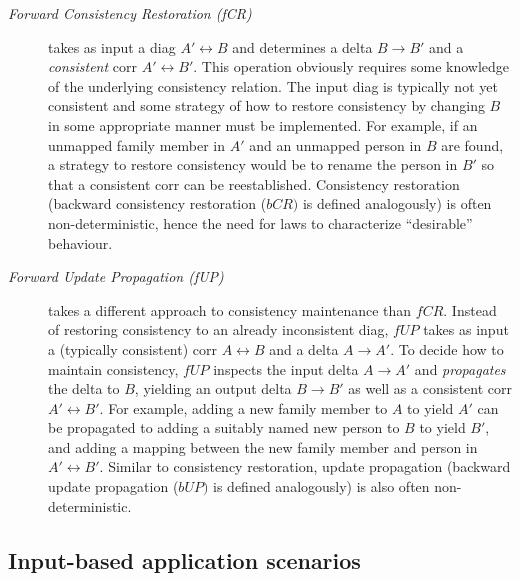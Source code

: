 \begin{description}
\item[\emph{Forward Consistency Restoration (fCR)}] takes as input a diag $A' \leftrightarrow B$ and determines a delta $B \rightarrow B'$ and a \emph{consistent} corr $A' \leftrightarrow B'$.
This operation obviously requires some knowledge of the underlying consistency relation.
The input diag is typically not yet consistent and some strategy of how to restore consistency by changing $B$ in some appropriate manner must be implemented.
For example, if an unmapped family member in $A'$ and an unmapped person in $B$ are found, a strategy to restore consistency would be to rename the person in $B'$ so that a consistent corr can be reestablished.
Consistency restoration (backward consistency restoration ($\mathit{bCR})$ is defined analogously) is often non-deterministic, hence the need for laws to characterize ``desirable'' behaviour.

\item[\emph{Forward Update Propagation (fUP)}] takes a different approach to consistency maintenance than $\mathit{fCR}$.
Instead of restoring consistency to an already inconsistent diag, $\mathit{fUP}$ takes as input a (typically consistent) corr $A \leftrightarrow B$ and a delta $A \rightarrow A'$.
To decide how to maintain consistency, $\mathit{fUP}$ inspects the input delta $A \rightarrow A'$ and \emph{propagates} the delta to $B$, yielding an output delta $B \rightarrow B'$ as well as a consistent corr $A' \leftrightarrow B'$.
For example, adding a new family member to $A$ to yield $A'$ can be propagated to adding a suitably named new person to $B$ to yield $B'$, and adding a mapping between the new family member and person in $A' \leftrightarrow B'$.  
Similar to consistency restoration, update propagation (backward update propagation ($\mathit{bUP})$ is defined analogously) is also often non-deterministic.
\end{description}

\subsection{Input-based application scenarios}
\label{sec:application-scenarios}


